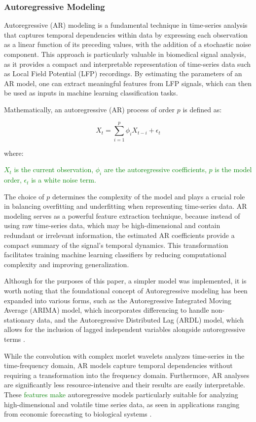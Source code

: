 \documentclass{article}
\begin{document}
\subsubsection{Autoregressive Modeling}

Autoregressive (AR) modeling is a fundamental technique in time-series analysis that captures temporal dependencies within data by expressing each observation as a linear function of its preceding values, with the addition of a stochastic noise component. This approach is particularly valuable in biomedical signal analysis, as it provides a compact and interpretable representation of time-series data such as Local Field Potential (LFP) recordings. By estimating the parameters of an AR model, one can extract meaningful features from LFP signals, which can then be used as inputs in machine learning classification tasks.

Mathematically, an autoregressive (AR) process of order \( p \) is defined as:

\[
X_t = \sum_{i=1}^{p} \phi_i X_{t-i} + \epsilon_t
\]

where:

\textcolor{green}{\( X_t \) is the current observation,
\( \phi_i \) are the autoregressive coefficients,
\( p \) is the model order,
\( \epsilon_t \) is a white noise term. \cite{box2008}}

The choice of \( p \) determines the complexity of the model and plays a crucial role in balancing overfitting and underfitting when representing time-series data. AR modeling serves as a powerful feature extraction technique, because instead of using raw time-series data, which may be high-dimensional and contain redundant or irrelevant information, the estimated AR coefficients provide a compact summary of the signal's temporal dynamics. This transformation facilitates training machine learning classifiers by reducing computational complexity and improving generalization.

Although for the purposes of this paper, a simpler model was implemented, it is worth noting that the foundational concept of Autoregressive modeling has been expanded into various forms, such as the Autoregressive Integrated Moving Average (ARIMA) model, which incorporates differencing to handle non-stationary data, and the Autoregressive Distributed Lag (ARDL) model, which allows for the inclusion of lagged independent variables alongside autoregressive terms \cite{agbenyega2022, natsiopoulos2022}.

While the convolution with complex morlet wavelets analyzes time-series in the time-frequency domain, AR models capture temporal dependencies without requiring a transformation into the frequency domain. Furthermore, AR analyses are significantly less resource-intensive and their results are easily interpretable. These \textcolor{green}{features make} autoregressive models particularly suitable for analyzing high-dimensional and volatile time series data, as seen in applications ranging from economic forecasting to biological systems \cite{regis2022}.
\end{document}
